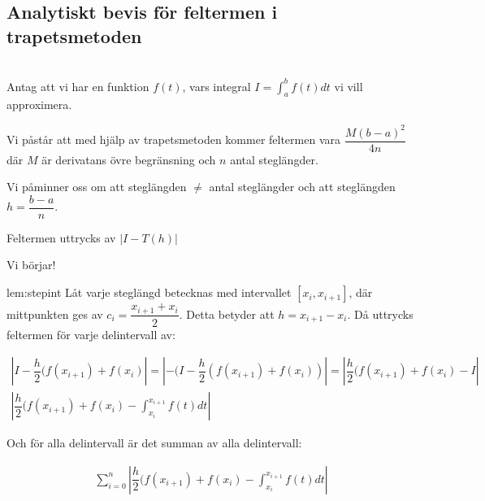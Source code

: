 \subsection{Analytiskt bevis för feltermen i trapetsmetoden}\hfill\\

\noindent Antag att vi har en funktion $f(t)$, vars integral $I =\int_{a}^{b}f(t)dt$ vi vill approximera.
\par\bigskip
\noindent Vi påstår att med hjälp av trapetsmetoden kommer feltermen vara $\dfrac{M(b-a)^2}{4n}$ där $M$ är derivatans övre begränsning och $n$ antal steglängder.
\par\bigskip
\noindent Vi påminner oss om att steglängden $\neq$ antal steglängder och att steglängden $h = \dfrac{b-a}{n}$.
\par\bigskip
\noindent Feltermen uttrycks av $|I-T(h)|$
\par\bigskip
\noindent Vi börjar!
\par\bigskip

\begin{lem}{lem:stepint}
  \noindent Låt varje steglängd betecknas med intervallet $[x_i, x_{i+1}]$, där mittpunkten ges av $c_i=\dfrac{x_{i+1}+x_{i}}{2}$. Detta betyder att $h = x_{i+1}-x_i$. Då uttrycks feltermen för varje delintervall av:

  \begin{equation*}
    \begin{gathered}
      \left|I-\dfrac{h}{2}(f(x_{i+1})+f(x_i)\right| = \left|-(I-\dfrac{h}{2}(f(x_{i+1})+f(x_i))\right| = \left|\dfrac{h}{2}(f(x_{i+1})+f(x_i)-I\right|\\
      \left|\dfrac{h}{2}(f(x_{i+1})+f(x_i)-\int_{x_i}^{x_{i+1}}f(t)dt\right|
    \end{gathered}
  \end{equation*}
  \par\bigskip
  \noindent Och för alla delintervall är det summan av alla delintervall:

  \begin{equation*}
    \begin{gathered}
      \sum_{i=0}^{n}\left|\dfrac{h}{2}(f(x_{i+1})+f(x_i)-\int_{x_i}^{x_{i+1}}f(t)dt\right|
    \end{gathered}
  \end{equation*}

\end{lem}
\par\bigskip

